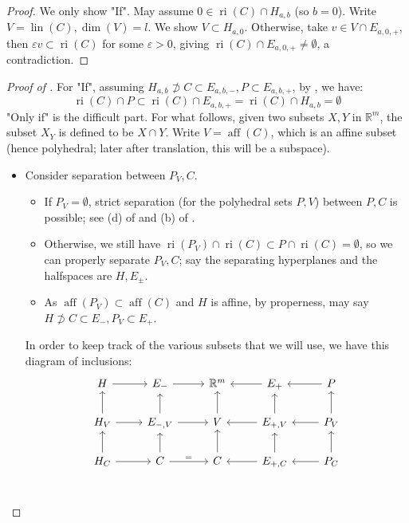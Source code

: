 \begin{proof}
	We only show "If". May assume $0\in \operatorname{ri}(C)\cap H_{a,b}$ (so $b=0$). Write $V=\operatorname{lin}(C),\dim(V)=l$. We show $V\subset H_{a,0}$. Otherwise, take $v\in V\cap E_{a,0,+}$, then $\varepsilon v\subset \operatorname{ri}(C)$ for some $\varepsilon >0$, giving $\operatorname{ri}(C)\cap E_{a,0,+}\neq\emptyset$, a contradiction.
\end{proof}

\begin{proof}[Proof of ]
	For "If", assuming $H_{a,b}\nsupset C\subset E_{a,b,-},P\subset E_{a,b,+}$, by , we have:
	\[
		\operatorname{ri}(C)\cap P\subset \operatorname{ri}(C)\cap E_{a,b,+}=\operatorname{ri}(C)\cap H_{a,b}=\emptyset
	\]
	"Only if" is the difficult part. For what follows, given two subsets $X,Y$ in $\mathbb{R}^m$, the subset $X_Y$ is defined to be $X\cap Y$. Write $V=\operatorname{aff}(C)$, which is an affine subset (hence polyhedral; later after translation, this will be a subspace).
	\begin{itemize}
		\item Consider separation between $P_V,C$.
		      \begin{itemize}
			      \item If $P_V=\emptyset$, strict separation (for the polyhedral sets $P,V$) between $P,C$ is possible; see (d) of  and (b) of .
			      \item Otherwise, we still have $\operatorname{ri}(P_V)\cap \operatorname{ri}(C)\subset P\cap \operatorname{ri}(C)=\emptyset$, so we can properly separate $P_V,C$; say the separating hyperplanes and the halfspaces are $H,E_{\pm}$.
			      \item As $\operatorname{aff}(P_V)\subset\operatorname{aff}(C)$ and $H$ is affine, by properness, may say $H\nsupset C\subset  E_{-},P_V\subset E_+$.
		      \end{itemize}
		      In order to keep track of the various subsets that we will use, we have this diagram of inclusions:
		      \[
			      \begin{tikzcd}
				      H\rar{}&E_-\rar{}&\mathbb{R}^m&\lar{}E_+&\lar{}P\\
				      H_V\rar{}\uar{}&E_{-,V}\rar{}\uar{}&V\uar{}&\lar{}E_{+,V}\uar{}&\lar{}P_V\uar{}\\
				      H_C\rar{}\uar{}&C\rar{=}\uar{}&C\uar{}&\lar{}E_{+,C}\uar{}&\lar{}P_C\uar{}\\

\end{tikzcd}\]
\end{itemize}
\end{proof}
